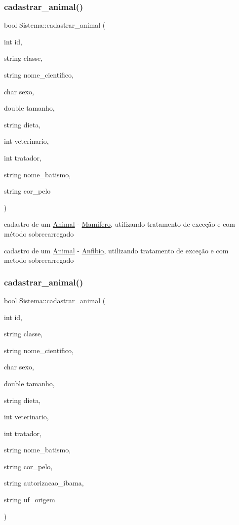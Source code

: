 \subsubsection{\texorpdfstring{cadastrar\_animal()}{cadastrar\_animal()}\hspace{0.1cm}{\footnotesize\ttfamily [7/12]}}
{\footnotesize\ttfamily bool Sistema\+::cadastrar\+\_\+animal (\begin{DoxyParamCaption}\item[{int}]{id,  }\item[{string}]{classe,  }\item[{string}]{nome\+\_\+cientifico,  }\item[{char}]{sexo,  }\item[{double}]{tamanho,  }\item[{string}]{dieta,  }\item[{int}]{veterinario,  }\item[{int}]{tratador,  }\item[{string}]{nome\+\_\+batismo,  }\item[{string}]{cor\+\_\+pelo }\end{DoxyParamCaption})}



cadastro de um \mbox{\hyperlink{class_animal}{Animal}} -\/ \mbox{\hyperlink{class_mamifero}{Mamifero}}, utilizando tratamento de exceção e com método sobrecarregado 

cadastro de um \mbox{\hyperlink{class_animal}{Animal}} -\/ \mbox{\hyperlink{class_anfibio}{Anfibio}}, utilizando tratamento de exceção e com metodo sobrecarregado \mbox{\label{class_sistema_a8a8ffc01c3b3a69f08cfb7224c2705c3}} 
\subsubsection{\texorpdfstring{cadastrar\_animal()}{cadastrar\_animal()}\hspace{0.1cm}{\footnotesize\ttfamily [8/12]}}
{\footnotesize\ttfamily bool Sistema\+::cadastrar\+\_\+animal (\begin{DoxyParamCaption}\item[{int}]{id,  }\item[{string}]{classe,  }\item[{string}]{nome\+\_\+cientifico,  }\item[{char}]{sexo,  }\item[{double}]{tamanho,  }\item[{string}]{dieta,  }\item[{int}]{veterinario,  }\item[{int}]{tratador,  }\item[{string}]{nome\+\_\+batismo,  }\item[{string}]{cor\+\_\+pelo,  }\item[{string}]{autorizacao\+\_\+ibama,  }\item[{string}]{uf\+\_\+origem }\end{DoxyParamCaption})}



